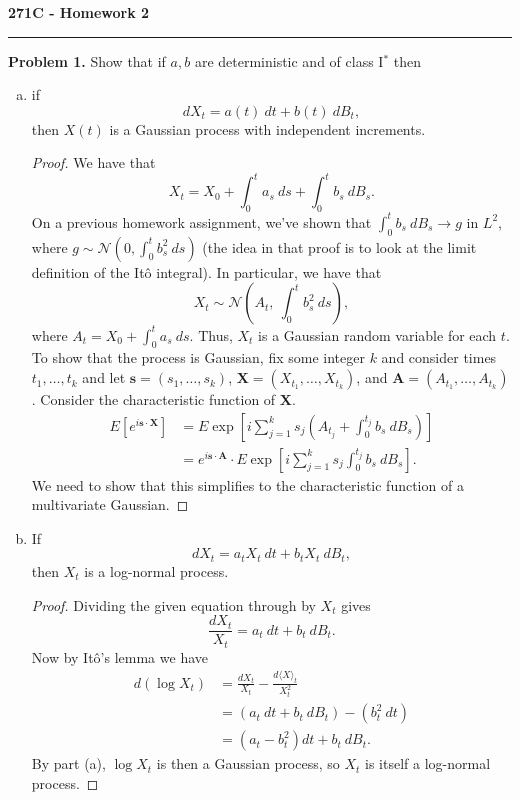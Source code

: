 \documentclass[11pt,letterpaper]{report}
\newcommand{\mcal}[1]{\mathcal{#1}}
\begin{document}
\begin{center}
{\bf \Large 271C - Homework 2}
\vspace{0.2cm}
\hrule
\end{center}

\noindent\textbf{Problem 1. }
Show that if $a,b$ are deterministic and of class I$^*$ then
\begin{enumerate}[(a)]
	\item if
	\[
	dX_t = a(t)\ dt + b(t)\ dB_t,
	\]
	then $X(t)$ is a Gaussian process with independent increments.
	\begin{proof}
		We have that
		\[
		X_t = X_0 + \int_0^ta_s\ ds + \int_0^tb_s\ dB_s.
		\]
		On a previous homework assignment, we've shown that $\int_0^tb_s\ dB_s\to g$ in $L^2$, where $g\sim \mcal{N}(0, \int_0^tb^2_s\ ds)$ (the idea in that proof is to look at the limit definition of the It\^o integral). In particular, we have that
		\[
		X_t \sim \mcal{N}\left( A_t,\ \int_0^t b^2_s\ ds\right),
		\]
		where $A_t = X_0 + \int_0^ta_s\ ds$. Thus, $X_t$ is a Gaussian random variable for each $t$. To show that the process is Gaussian, fix some integer $k$ and consider times $t_1, \ldots, t_k$ and let $\mathbf{s} = (s_1, \ldots, s_k)$, $\mathbf{X} = (X_{t_1}, \ldots, X_{t_k})$, and $\mathbf{A} = (A_{t_1}, \ldots, A_{t_k})$. Consider the characteristic function of $\mathbf{X}$.
		\begin{align*}
			E[e^{i\mathbf{s}\cdot \mathbf{X}}] &= E\exp\left[i\sum_{j=1}^ks_j\left(A_{t_j} + \int_0^{t_j}b_s\ dB_s \right) \right]\\
			&= e^{i\mathbf{s}\cdot \mathbf{A}}\cdot E\exp\left[i\sum_{j=1}^ks_j\int_0^{t_j}b_s\ dB_s \right].
		\end{align*}
		We need to show that this simplifies to the characteristic function of a multivariate Gaussian.
	\end{proof}

	\item If
	\[
	dX_t = a_tX_t\ dt + b_tX_t\ dB_t,
	\]
	then $X_t$ is a log-normal process.
	\begin{proof}
		Dividing the given equation through by $X_t$ gives
		\[
		\frac{dX_t}{X_t} = a_t\ dt + b_t\ dB_t.
		\]
		Now by It\^o's lemma we have
		\begin{align*}
		d(\log X_t) &= \frac{dX_t}{X_t} - \frac{d\langle X\rangle_t}{X_t^2}\\
		&= (a_t\ dt + b_t\ dB_t) - (b_t^2\ dt)\\
		&= (a_t - b_t^2)dt + b_t\ dB_t.
		\end{align*}
		By part (a), $\log X_t$ is then a Gaussian process, so $X_t$ is itself a log-normal process.
	\end{proof}
\end{enumerate}
\end{document}
